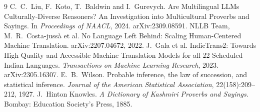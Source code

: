 \documentclass[11pt]{article}
\begin{document}
\begin{thebibliography}{9}
 C.~C.~Liu, F.~Koto, T.~Baldwin and I.~Gurevych. Are Multilingual LLMs Culturally-Diverse Reasoners? An Investigation into Multicultural Proverbs and Sayings. In \emph{Proceedings of NAACL}, 2024. arXiv:2309.08591.
 NLLB Team, M.~R.~Costa-juss\`a et al. No Language Left Behind: Scaling Human-Centered Machine Translation. arXiv:2207.04672, 2022.
 J.~Gala et al. IndicTrans2: Towards High-Quality and Accessible Machine Translation Models for all 22 Scheduled Indian Languages. \emph{Transactions on Machine Learning Research}, 2023. arXiv:2305.16307.
 E.~B.~Wilson. Probable inference, the law of succession, and statistical inference. \emph{Journal of the American Statistical Association}, 22(158):209--212, 1927.
 J.~Hinton Knowles. \emph{A Dictionary of Kashmiri Proverbs and Sayings}. Bombay: Education Society's Press, 1885.
\end{thebibliography}
\end{document}
